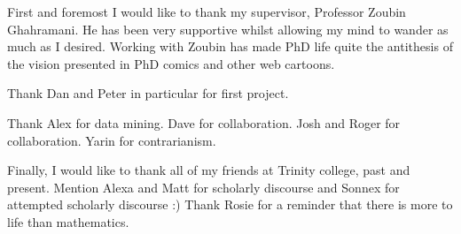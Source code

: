 
\begin{acknowledgements}      

First and foremost I would like to thank my supervisor, Professor Zoubin Ghahramani.
He has been very supportive whilst allowing my mind to wander as much as I desired.
Working with Zoubin has made PhD life quite the antithesis of the vision presented in PhD comics and other web cartoons.

Thank Dan and Peter in particular for first project.

Thank Alex for data mining.
Dave for collaboration.
Josh and Roger for collaboration.
Yarin for contrarianism.

Finally, I would like to thank all of my friends at Trinity college, past and present.
Mention Alexa and Matt for scholarly discourse and Sonnex for attempted scholarly discourse :)
Thank Rosie for a reminder that there is more to life than mathematics.

\end{acknowledgements}
